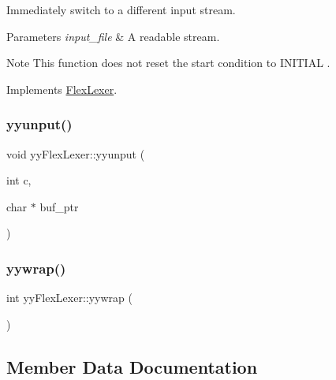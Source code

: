 Immediately switch to a different input stream. 
\begin{DoxyParams}{Parameters}
{\em input\+\_\+file} & A readable stream.\\
\hline
\end{DoxyParams}
\begin{DoxyNote}{Note}
This function does not reset the start condition to {\ttfamily I\+N\+I\+T\+I\+AL} . 
\end{DoxyNote}


Implements \hyperlink{classFlexLexer_a15aea8e169874756674e4f79553e68ed}{Flex\+Lexer}.

\mbox{\label{classyyFlexLexer_a54064ce670d0caa1a45c5656d5e11538}} 
\subsubsection{\texorpdfstring{yyunput()}{yyunput()}}
{\footnotesize\ttfamily void yy\+Flex\+Lexer\+::yyunput (\begin{DoxyParamCaption}\item[{int}]{c,  }\item[{char $\ast$}]{buf\+\_\+ptr }\end{DoxyParamCaption})\hspace{0.3cm}{\ttfamily [protected]}}

\mbox{\label{classyyFlexLexer_a9e46b16e6374b1b7ae696e2ba5fdc07c}} 
\subsubsection{\texorpdfstring{yywrap()}{yywrap()}}
{\footnotesize\ttfamily int yy\+Flex\+Lexer\+::yywrap (\begin{DoxyParamCaption}{ }\end{DoxyParamCaption})\hspace{0.3cm}{\ttfamily [virtual]}}



\subsection{Member Data Documentation}
\mbox{\label{classyyFlexLexer_ae4914f003bda6f0dfc20e30703673bea}} 
